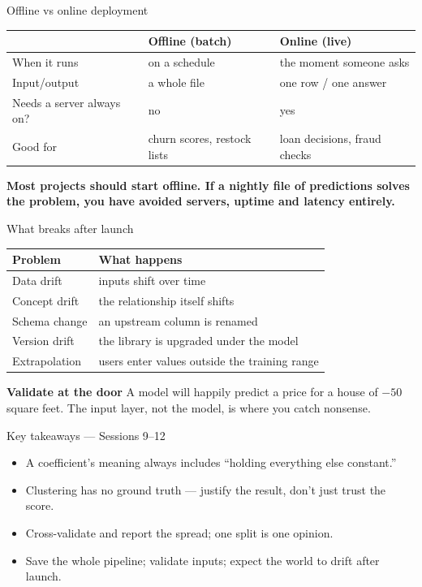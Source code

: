 \documentclass[10pt,aspectratio=169]{beamer}
\newcommand{\keyidea}[1]{%
  \begin{block}{}
  \centering\Large\bfseries\color{dsblue} #1
  \end{block}%
}
\newcommand{\trapbox}[2]{%
  \begin{alertblock}{\textbf{#1}}
  #2
  \end{alertblock}%
}
\begin{document}
\begin{frame}{Offline vs online deployment}
\begin{table}
\footnotesize
\begin{tabularx}{\linewidth}{@{}lXX@{}}
\toprule
& \textbf{Offline (batch)} & \textbf{Online (live)} \\
\midrule
When it runs & on a schedule & the moment someone asks \\
Input/output & a whole file & one row / one answer \\
Needs a server always on? & no & yes \\
Good for & churn scores, restock lists & loan decisions, fraud checks \\
\bottomrule
\end{tabularx}
\end{table}
\keyidea{Most projects should start offline. If a nightly file of predictions solves the problem, you have avoided servers, uptime and latency entirely.}
\end{frame}

\begin{frame}{What breaks after launch}
\begin{table}
\footnotesize
\begin{tabularx}{\linewidth}{@{}lX@{}}
\toprule
\textbf{Problem} & \textbf{What happens} \\
\midrule
Data drift & inputs shift over time \\
Concept drift & the relationship itself shifts \\
Schema change & an upstream column is renamed \\
Version drift & the library is upgraded under the model \\
Extrapolation & users enter values outside the training range \\
\bottomrule
\end{tabularx}
\end{table}
\trapbox{Validate at the door}{A model will happily predict a price for a house of $-50$ square feet. The input layer, not the model, is where you catch nonsense.}
\end{frame}

\begin{frame}{Key takeaways --- Sessions 9--12}
\begin{itemize}
\item A coefficient's meaning always includes ``holding everything else constant.''
\item Clustering has no ground truth --- justify the result, don't just trust the score.
\item Cross-validate and report the spread; one split is one opinion.
\item Save the whole pipeline; validate inputs; expect the world to drift after launch.
\end{itemize}
\end{frame}
\end{document}
